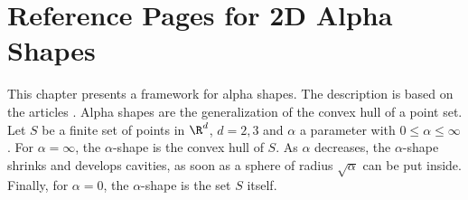 %
%
%
%
%
%
%
%
%
%



\clearpage
\section{Reference Pages for 2D Alpha Shapes}

This chapter presents a framework for alpha shapes. The description is based on
the articles \cite{em-tdas-94,e-was-92}. Alpha shapes are
the generalization of the convex hull of a point set. Let $S$ be a finite set of
points in $\R^d$, $d = 2,3$ and $\alpha$ a parameter with $0 \leq \alpha \leq
\infty$. For $\alpha = \infty$, the $\alpha$-shape is the convex hull of $S$. As 
$\alpha$ decreases, the $\alpha$-shape shrinks and develops cavities, as soon as 
a sphere of radius $\sqrt{\alpha}$ can be put inside.
Finally, for $\alpha = 0$, the $\alpha$-shape is the set $S$ itself.

